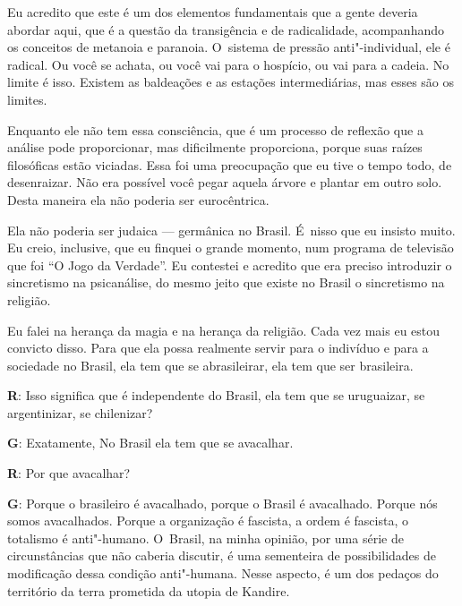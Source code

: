  

Eu acredito que este é um dos elementos fundamentais que a gente deveria
abordar aqui, que é a questão da transigência e de radicalidade,
acompanhando os conceitos de metanoia e paranoia. O~sistema de pressão
anti"-individual, ele é radical. Ou você se achata, ou você vai para o
hospício, ou vai para a cadeia. No limite é isso. Existem as baldeações
e as estações intermediárias, mas esses são os limites.

 

Enquanto ele não tem essa consciência, que é um processo de reflexão que
a análise pode proporcionar, mas dificilmente proporciona, porque suas
raízes filosóficas estão viciadas. Essa foi uma preocupação que eu tive
o tempo todo, de desenraizar. Não era possível você pegar aquela árvore
e plantar em outro solo. Desta maneira ela não poderia ser eurocêntrica.

 

Ela não poderia ser judaica --- germânica no Brasil. É~nisso que eu
insisto muito. Eu creio, inclusive, que eu finquei o grande momento, num
programa de televisão que foi ``O Jogo da Verdade''. Eu contestei e
acredito que era preciso introduzir o sincretismo na psicanálise, do
mesmo jeito que existe no Brasil o sincretismo na religião.

 

Eu falei na herança da magia e na herança da religião. Cada vez mais eu
estou convicto disso. Para que ela possa realmente servir para o
indivíduo e para a sociedade no Brasil, ela tem que se abrasileirar, ela
tem que ser brasileira.

 

\textbf{R}: Isso significa que é independente do Brasil, ela tem que se
uruguaizar, se argentinizar, se chilenizar?

 

\textbf{G}: Exatamente, No Brasil ela tem que se avacalhar.

 

\textbf{R}: Por que avacalhar?

 

\textbf{G}: Porque o brasileiro é avacalhado, porque o Brasil é
avacalhado. Porque nós somos avacalhados. Porque a organização é
fascista, a ordem é fascista, o totalismo é anti"-humano. O~Brasil, na
minha opinião, por uma série de circunstâncias que não caberia discutir,
é uma sementeira de possibilidades de modificação dessa condição
anti"-humana. Nesse aspecto, é um dos pedaços do território da terra
prometida da utopia de Kandire.

